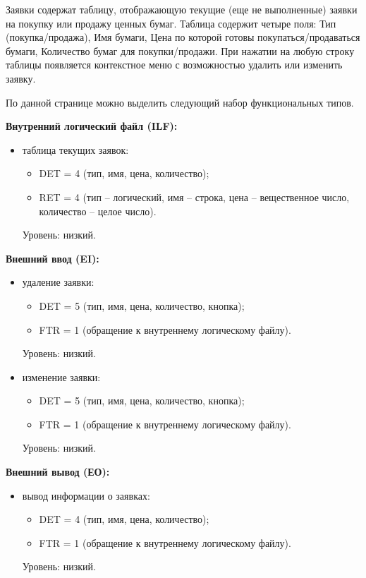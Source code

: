 
Заявки содержат таблицу, отображающую текущие (еще не выполненные) заявки на покупку или продажу ценных бумаг. Таблица содержит четыре поля: Тип (покупка/продажа), Имя бумаги, Цена по которой готовы покупаться/продаваться бумаги, Количество бумаг для покупки/продажи. При нажатии на любую строку таблицы появляется контекстное меню с возможностью удалить или изменить заявку.

По данной странице можно выделить следующий набор функциональных типов.


\textbf{Внутренний логический файл (ILF):}

\begin{itemize}
    \item таблица текущих заявок:
    \begin{itemize}
        \item DET = 4 (тип, имя, цена, количество);
        \item RET = 4 (тип -- логический, имя -- строка, цена -- вещественное число, количество -- целое число).
    \end{itemize}
    Уровень: низкий.
\end{itemize}

\textbf{Внешний ввод (EI):}

\begin{itemize}
    \item удаление заявки:
    \begin{itemize}
        \item DET = 5 (тип, имя, цена, количество, кнопка);
        \item FTR = 1 (обращение к внутреннему логическому файлу).
    \end{itemize}
    Уровень: низкий.

    \item изменение заявки:
    \begin{itemize}
        \item DET = 5 (тип, имя, цена, количество, кнопка);
        \item FTR = 1 (обращение к внутреннему логическому файлу).
    \end{itemize}
    Уровень: низкий.
\end{itemize}

\textbf{Внешний вывод (ЕО):}

\begin{itemize}
    \item вывод информации о заявках:
    \begin{itemize}
        \item DET = 4 (тип, имя, цена, количество);
        \item FTR = 1 (обращение к внутреннему логическому файлу).
    \end{itemize}
    Уровень: низкий.
\end{itemize}

